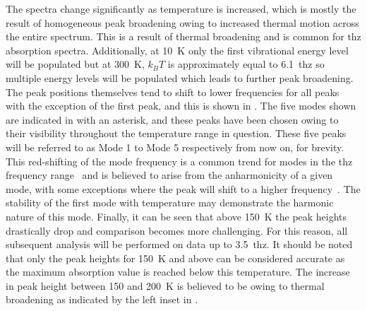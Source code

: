 The spectra change significantly as temperature is increased, which is mostly the result of homogeneous peak broadening owing to increased thermal motion across the entire spectrum. This is a result of thermal broadening and is common for \acrshort{thz} absorption spectra. Additionally, at \SI{10}{K} only the first vibrational energy level will be populated but at \SI{300}{K}, \(k_BT\) is approximately equal to \SI{6.1}{\acrshort{thz}} so multiple energy levels will be populated which leads to further peak broadening. The peak positions themselves tend to shift to lower frequencies for all peaks with the exception of the first peak, and this is shown in . The five modes shown are indicated in  with an asterisk, and these peaks have been chosen owing to their visibility throughout the temperature range in question. These five peaks will be referred to as Mode 1 to Mode 5 respectively from now on, for brevity. This red\nobreakdash-shifting of the mode frequency is a common trend for modes in the \acrshort{thz} frequency range~\cite{Allen2021} and is believed to arise from the anharmonicity of a given mode, with some exceptions where the peak will shift to a higher frequency~\cite{Walther2003}. The stability of the first mode with temperature may demonstrate the harmonic nature of this mode. Finally, it can be seen that above \SI{150}{K} the peak heights drastically drop and comparison becomes more challenging. For this reason, all subsequent analysis will be performed on data up to \SI{3.5}{\acrshort{thz}}. It should be noted that only the peak heights for \SI{150}{K} and above can be considered accurate as the maximum absorption value is reached below this temperature. The increase in peak height between 150 and \SI{200}{K} is believed to be owing to thermal broadening as indicated by the left inset in .


